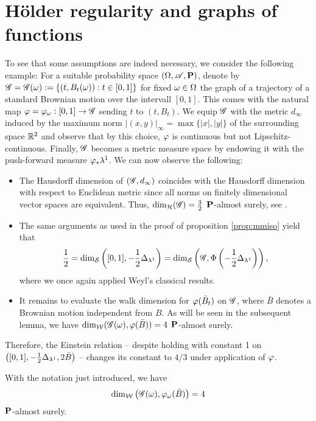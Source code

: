 \newpage

\section{H\"older regularity and graphs of functions}

To see that some assumptions are indeed necessary, we consider the following example: For a suitable probability space $(\Omega,\mathscr{A},\mathbf{P})$, denote by $\mathscr{G}=\mathscr{G}(\omega):=\left\{(t,B_t(\omega)):t\in[0,1] \right\}$ for fixed $\omega\in\Omega$ the graph of a trajectory of a standard Brownian motion over the intervall $[0,1]$. This comes with the natural map $\varphi=\varphi_\omega:[0,1]\to\mathscr{G}$ sending $t$ to $(t,B_t)$. We equip $\mathscr{G}$ with the metric $d_\infty$ induced by the maximum norm
$|(x,y)|_\infty=\max\{|x|,|y|\}$ of the surrounding space $\mathbb{R}^2$ and observe that by this choice, $\varphi$ is continuous but not Lipschitz-continuous. Finally, $\mathscr{G}$ becomes a metric measure space by endowing it with the push-forward measure $\varphi_*\lambda^1$. We can now observe the following:
\begin{itemize}
  \item The Hausdorff dimension of $(\mathscr{G},d_\infty)$ coincides with the Hausdorff dimension with respect to Euclidean  metric since all norms on finitely dimensional vector spaces are equivalent. Thus, $\dim_{\mathcal{H}}(\mathscr{G})=\frac{3}{2}$ $\mathbf{P}$-almost surely, see \cite[Theorem 16.7]{falconer2007fractal}. 
  \item The same arguments as used in the proof of proposition \ref{prop:mmiso} yield that 
  \[
    \frac{1}{2}=\dim_{\mathcal{S}}\left([0,1],-\frac{1}{2}\Delta_{\lambda^1}\right)
    =\dim_{\mathcal{S}}\left(\mathscr{G},\Phi \left(-\frac{1}{2}\Delta_{\lambda^1}\right)\right),
  \]
  where we once again applied Weyl's classical results. 
  \item It remains to evaluate the walk dimension for $\varphi(\bar B_t)$ on $\mathscr{G}$, where $\bar B$ denotes a Brownian motion independent from $B$. As will be seen in the subsequent lemma, we have $\dim_{\mathcal{W}}(\mathscr{G}(\omega),\varphi(\bar B))=4$ $\mathbf{P}$-almost surely.
\end{itemize}
Therefore, the Einstein relation -- despite holding with constant 1 on 
$\left([0,1],-\frac{1}{2}\Delta_{\lambda^1},2\bar B\right)$ -- changes its constant to $4/3$ under application of $\varphi$. 
\begin{lem}
  With the notation just introduced, we have 
  \begin{equation}\label{eq:BMdimw}
    \dim_{\mathcal{W}}\big(\mathscr{G}(\omega),\varphi_\omega(\bar B)\big)=4
  \end{equation}
  $\mathbf{P}$-almost surely.
\end{lem}
